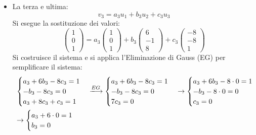 \documentclass[a4paper]{article}
\begin{document}
\begin{itemize}
		\item La terza e ultima:
		\begin{equation*}
			v_{3} = a_{3} u_{1} + b_{3} u_{2} + c_{3} u_{3}
		\end{equation*}
		Si esegue la sostituzione dei valori:
		\begin{equation*}
			\begin{pmatrix}
				1 \\ 0 \\ 1
			\end{pmatrix} =
			a_{3} \begin{pmatrix}
				1 \\ 0 \\ 1
			\end{pmatrix} +
			b_{3} \begin{pmatrix}
				6 \\ -1 \\ 8
			\end{pmatrix} +
			c_{3} \begin{pmatrix}
				-8 \\ -8 \\ 1
			\end{pmatrix}
		\end{equation*}
		Si costruisce il sistema e si applica l'Eliminazione di Gauss (EG) per semplificare il sistema:
		\begin{equation*}
			\begin{array}{l}
				\begin{cases}
					a_{3} + 6b_{3} - 8c_{3} = 1 \\
					-b_{3} - 8c_{3} = 0 \\
					a_{3} + 8c_{3} + c_{3} = 1
				\end{cases} \xlongrightarrow{EG}
				\begin{cases}
					a_{3} + 6b_{3} - 8c_{3} = 1 \\
					-b_{3} - 8c_{3} = 0 \\
					7c_{3} = 0
				\end{cases} \rightarrow
				\begin{cases}
					a_{3} + 6b_{3} - 8 \cdot 0 = 1 \\
					-b_{3} - 8 \cdot 0 = 0 \\
					c_{3} = 0
				\end{cases} \\ [2em]
				\rightarrow \begin{cases}
					a_{3} + 6 \cdot 0 = 1 \\
					b_{3} = 0 \\

\end{cases}
\end{array}
\end{equation*}
\end{itemize}
\end{document}
